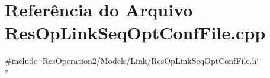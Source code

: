 \section{Referência do Arquivo Res\+Op\+Link\+Seq\+Opt\+Conf\+File.\+cpp}
\label{_res_op_link_seq_opt_conf_file_8cpp}
{\ttfamily \#include \char`\"{}Res\+Operation2/\+Models/\+Link/\+Res\+Op\+Link\+Seq\+Opt\+Conf\+File.\+h\char`\"{}}\\*
